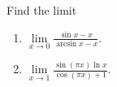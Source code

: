 Find the limit
\begin{multicols}{2}
\begin{enumerate}
\item $\lim\limits_{x\to 0} \frac{\sin x-x }{\arcsin x-x } $.
\item $\lim\limits_{x\to 1} \frac{\sin \left(\pi x\right)\ln x }{\cos(\pi x)+1 } $.
\end{enumerate}
\end{multicols}